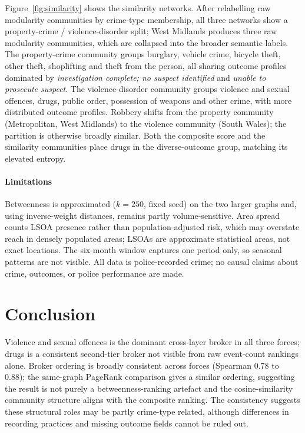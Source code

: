 \documentclass[conference,a4paper]{IEEEtran}
\begin{document}
Figure~\ref{fig:similarity} shows the similarity networks.
After relabelling raw modularity communities by crime-type membership,
all three networks show a property-crime / violence-disorder split;
West Midlands produces three raw modularity communities, which are
collapsed into the broader semantic labels.
The property-crime community groups burglary, vehicle crime, bicycle
theft, other theft, shoplifting and theft from the person, all sharing
outcome profiles dominated by \textit{investigation complete; no
suspect identified} and \textit{unable to prosecute suspect}.
The violence-disorder community groups violence and sexual offences,
drugs, public order, possession of weapons and other crime, with more
distributed outcome profiles.
Robbery shifts from the property community (Metropolitan, West
Midlands) to the violence community (South Wales); the partition is
otherwise broadly similar.
Both the composite score and the similarity communities place drugs
in the diverse-outcome group, matching its elevated entropy.

\paragraph*{Limitations}
Betweenness is approximated ($k{=}250$, fixed seed) on the two larger
graphs and, using inverse-weight distances, remains partly
volume-sensitive.
Area spread counts LSOA presence rather than population-adjusted risk,
which may overstate reach in densely populated areas; LSOAs are
approximate statistical areas, not exact locations.
The six-month window captures one period only, so seasonal patterns
are not visible.
All data is police-recorded crime; no causal claims about crime,
outcomes, or police performance are made.

\vspace{-4pt}
\section{Conclusion}
\vspace{-2pt}

Violence and sexual offences is the dominant cross-layer broker in all
three forces; drugs is a consistent second-tier broker not visible
from raw event-count rankings alone. Broker ordering is broadly
consistent across forces (Spearman 0.78 to 0.88); the same-graph
PageRank comparison gives a similar ordering, suggesting the result is
not purely a betweenness-ranking artefact and the cosine-similarity
community structure aligns with the composite ranking. The consistency
suggests these structural roles may be partly crime-type related,
although differences in recording practices and missing outcome fields
cannot be ruled out.
\end{document}
